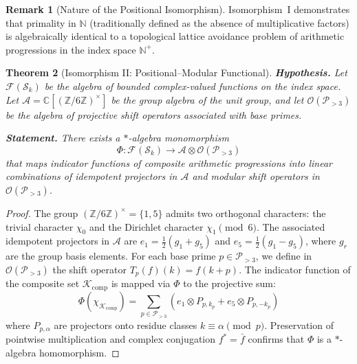 \documentclass{article}
\numberwithin{equation}{section}
\theoremstyle{plain}
\newtheorem{theorem}{Theorem}[section]
\theoremstyle{definition}
\newtheorem{remark}[theorem]{Remark}
\begin{document}
\begin{remark}[Nature of the Positional Isomorphism]
Isomorphism~I demonstrates that primality in $\mathbb{N}$ (traditionally defined as the absence of multiplicative factors) is algebraically identical to a topological lattice avoidance problem of arithmetic progressions in the index space $\mathbb{N}^+$.
\end{remark}

\begin{theorem}[Isomorphism II: Positional--Modular Functional]
\label{thm:iso-II}
\textbf{Hypothesis.} Let $\mathcal{F}(\mathcal{S}_k)$ be the algebra of bounded complex-valued functions on the index space. Let $\mathcal{A} = \mathbb{C}[(\mathbb{Z}/6\mathbb{Z})^\times]$ be the group algebra of the unit group, and let $\mathcal{O}(\mathcal{P}_{>3})$ be the algebra of projective shift operators associated with base primes.

\textbf{Statement.} There exists a $\ast$-algebra monomorphism
\begin{equation}
\Phi: \mathcal{F}(\mathcal{S}_k) \longrightarrow \mathcal{A} \otimes \mathcal{O}(\mathcal{P}_{>3})
\end{equation}
that maps indicator functions of composite arithmetic progressions into linear combinations of idempotent projectors in $\mathcal{A}$ and modular shift operators in $\mathcal{O}(\mathcal{P}_{>3})$.
\end{theorem}

\begin{proof}
The group $(\mathbb{Z}/6\mathbb{Z})^\times = \{1, 5\}$ admits two orthogonal characters: the trivial character $\chi_0$ and the Dirichlet character $\chi_1 \pmod 6$. The associated idempotent projectors in $\mathcal{A}$ are $e_1 = \frac{1}{2}(g_1 + g_5)$ and $e_5 = \frac{1}{2}(g_1 - g_5)$, where $g_r$ are the group basis elements. For each base prime $p \in \mathcal{P}_{>3}$, we define in $\mathcal{O}(\mathcal{P}_{>3})$ the shift operator $T_p(f)(k) = f(k + p)$. The indicator function of the composite set $\mathcal{K}_{\text{comp}}$ is mapped via $\Phi$ to the projective sum:
\begin{equation}
\Phi(\chi_{\mathcal{K}_{\text{comp}}}) = \sum_{p \in \mathcal{P}_{>3}} \left( e_1 \otimes P_{p, k_p} + e_5 \otimes P_{p, -k_p} \right)
\end{equation}
where $P_{p, \alpha}$ are projectors onto residue classes $k \equiv \alpha \pmod p$. Preservation of pointwise multiplication and complex conjugation $f^* = \bar{f}$ confirms that $\Phi$ is a $\ast$-algebra homomorphism.
\end{proof}
\end{document}

